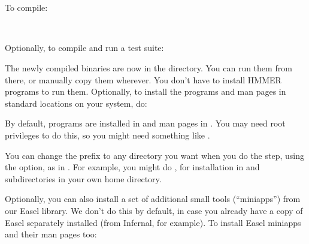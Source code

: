   \vspace{1ex}
  \\
  \\
  \vspace{1ex}

To compile:

  \vspace{1ex}
  \\ 
  \vspace{1ex}

Optionally, to compile and run a test suite:

  \vspace{1ex}
  \vspace{1ex}

The newly compiled binaries are now in the  directory.  You
can run them from there, or manually copy them wherever.  You don't
have to install HMMER programs to run them. Optionally, to install the
programs and man pages in standard locations on your system, do:

  \vspace{1ex}
  \vspace{1ex}

By default, programs are installed in  and man
pages in . You may need root
privileges to do this, so you might need something like .

You can change the  prefix to any directory you want
when you do the  step, using the  option, as in . For example, you might do
, for installation in
 and  subdirectories in your own home
directory.

Optionally, you can also install a set of additional small tools
(``miniapps'') from our Easel library.  We don't do this by default,
in case you already have a copy of Easel separately installed (from
Infernal, for example). To install Easel miniapps and their man pages
too:

